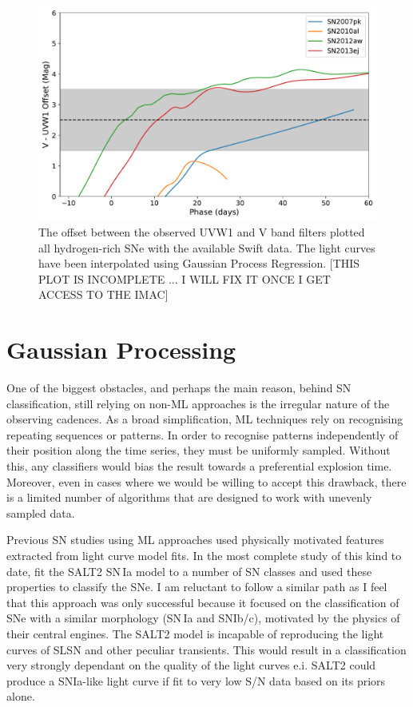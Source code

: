 \begin{figure}
  \centering
  \includegraphics[width=\textwidth]{Figures/Chapter4/VOffset_II}
  \caption{The offset between the observed UVW1 and V band filters plotted all hydrogen-rich SNe with the available Swift data. The light curves have been interpolated using Gaussian Process Regression. [THIS PLOT IS INCOMPLETE ... I WILL FIX IT ONCE I GET ACCESS TO THE IMAC]}
  \label{fig:SNIIbbExtension}
\end{figure}

\section{Gaussian Processing} \label{sec:GP}
One of the biggest obstacles, and perhaps the main reason, behind SN classification, still relying on non-ML approaches is the irregular nature of the observing cadences. As a broad simplification, ML techniques rely on recognising repeating sequences or patterns. In order to recognise patterns independently of their position along the time series, they must be uniformly sampled. Without this, any classifiers would bias the result towards a preferential explosion time. Moreover, even in cases where we would be willing to accept this drawback, there is a limited number of algorithms that are designed to work with unevenly sampled data.

Previous SN studies using ML approaches used physically motivated features extracted from light curve model fits. In the most complete study of this kind to date, \citet{Lochner2016} fit the SALT2 SN\,Ia model to a number of SN classes and used these properties to classify the SNe. I am reluctant to follow a similar path as I feel that this approach was only successful because it focused on the classification of SNe with a similar morphology (SN\,Ia and SNIb/c), motivated by the physics of their central engines. The SALT2 model is incapable of reproducing the light curves of SLSN and other peculiar transients. This would result in a classification very strongly dependant on the quality of the light curves e.i. SALT2 could produce a SNIa-like light curve if fit to very low S/N data based on its priors alone.

